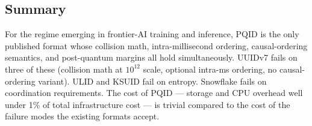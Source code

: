 \subsection{Summary}

For the regime emerging in frontier-AI training and inference, PQID is the only published format whose collision math, intra-millisecond ordering, causal-ordering semantics, and post-quantum margins all hold simultaneously. UUIDv7 fails on three of these (collision math at $10^{12}$ scale, optional intra-ms ordering, no causal-ordering variant). ULID and KSUID fail on entropy. Snowflake fails on coordination requirements. The cost of PQID --- storage and CPU overhead well under 1\% of total infrastructure cost --- is trivial compared to the cost of the failure modes the existing formats accept.

